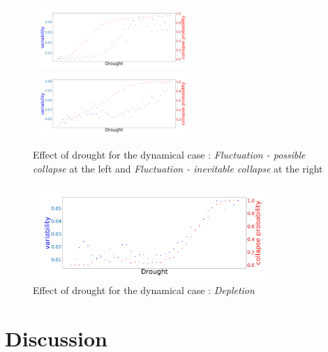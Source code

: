 \documentclass{article}
\begin{document}
\begin{figure}[h]
\begin{center}
\includegraphics[width=6cm]{results/drought/equivalent_moderate.png}
\includegraphics[width=6cm]{results/drought/equivalent_always.png}
\end{center}
\caption{\label{fig:temp}Effect of drought for the dynamical case : \textit{Fluctuation - possible collapse} at the left and \textit{Fluctuation - inevitable collapse} at the right}
\end{figure}


\newpage


\begin{figure}[h]
\begin{center}
\includegraphics[width=9cm]{results/drought/fuel_low.png}
\end{center}
\caption{\label{fig:temp}Effect of drought for the dynamical case : \textit{Depletion}}
\end{figure}







\newpage
\section{Discussion}
\label{Discussion}
\end{document}
